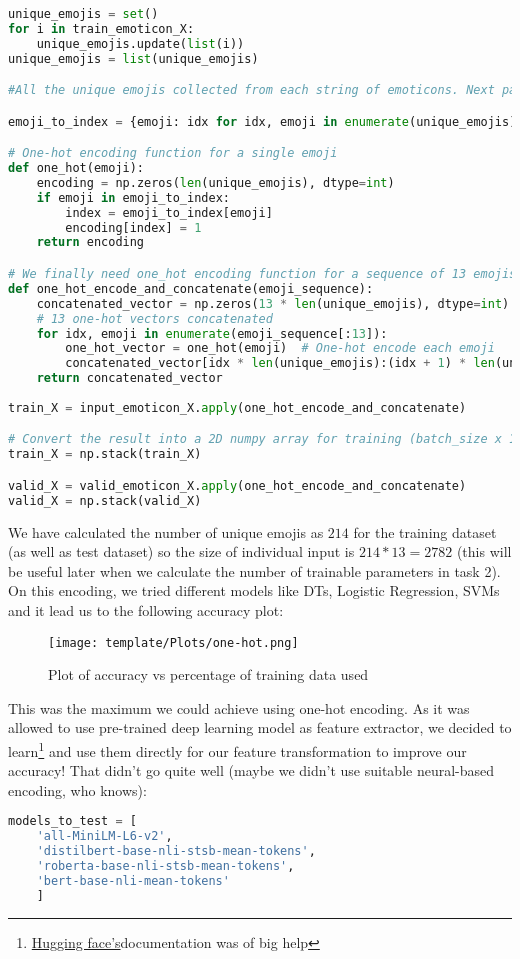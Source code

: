 \documentclass{article} %
\begin{document}
\begin{lstlisting}[language=Python]
unique_emojis = set()
for i in train_emoticon_X:
    unique_emojis.update(list(i))
unique_emojis = list(unique_emojis)

#All the unique emojis collected from each string of emoticons. Next part is creating emoji-to-index dictionary

emoji_to_index = {emoji: idx for idx, emoji in enumerate(unique_emojis)}

# One-hot encoding function for a single emoji
def one_hot(emoji):
    encoding = np.zeros(len(unique_emojis), dtype=int)
    if emoji in emoji_to_index:
        index = emoji_to_index[emoji]
        encoding[index] = 1
    return encoding

# We finally need one_hot encoding function for a sequence of 13 emojis
def one_hot_encode_and_concatenate(emoji_sequence):
    concatenated_vector = np.zeros(13 * len(unique_emojis), dtype=int) 
    # 13 one-hot vectors concatenated
    for idx, emoji in enumerate(emoji_sequence[:13]):
        one_hot_vector = one_hot(emoji)  # One-hot encode each emoji
        concatenated_vector[idx * len(unique_emojis):(idx + 1) * len(unique_emojis)] = one_hot_vector  # Concatenate
    return concatenated_vector
    
train_X = input_emoticon_X.apply(one_hot_encode_and_concatenate)

# Convert the result into a 2D numpy array for training (batch_size x 13 * num_unique_emojis)
train_X = np.stack(train_X)

valid_X = valid_emoticon_X.apply(one_hot_encode_and_concatenate)
valid_X = np.stack(valid_X)

\end{lstlisting}

We have calculated the number of unique emojis as $214$ for the training dataset (as well as test dataset) so the size of individual input is $214*13 = 2782$ (this will be useful later when we calculate the number of trainable parameters in task 2). On this encoding, we tried different models like DTs, Logistic Regression, SVMs and it lead us to the following accuracy plot:

\begin{figure}[h!]
    \centering
    \texttt{[image: template/Plots/one-hot.png]}
    \caption{Plot of accuracy vs percentage of training data used}
    \label{fig:2}
\end{figure}
This was the maximum we could achieve using one-hot encoding. As it was allowed to use pre-trained deep learning model as feature extractor, we decided to learn\footnote{\href{https://huggingface.co/sentence-transformers}{Hugging face's}documentation was of big help} and use them directly for our feature transformation to improve our accuracy! That didn't go quite well (maybe we didn't use suitable neural-based encoding, who knows): 
\begin{lstlisting}[language=Python]
    models_to_test = [
    'all-MiniLM-L6-v2',
    'distilbert-base-nli-stsb-mean-tokens',
    'roberta-base-nli-stsb-mean-tokens',
    'bert-base-nli-mean-tokens'
    ]
\end{lstlisting}
\end{document}

